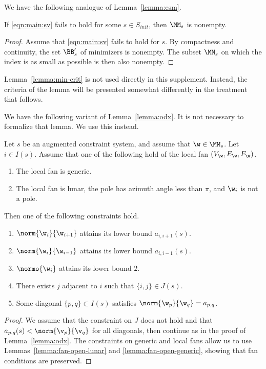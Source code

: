 We have the following analogue of Lemma~\ref{lemma:esm}.

\begin{lemma}\label{lemma:init}
If \eqref{eqn:main:sv} fails to hold for some $s\in S_{init}$, 
then $\MM_s$ is nonempty.
\end{lemma}

\begin{proof}  Assume that \eqref{eqn:main:sv} fails to hold for
$s$.  By compactness and continuity, the set 
$\BB'_s$ of minimizers is nonempty.   
The subset $\MM_s$ on which the index is as small as possible
is then also nonempty.
\end{proof}

Lemma~\ref{lemma:min-crit} is not used directly in this supplement.
Instead, the criteria of the lemma will be presented somewhat differently
in the treatment that follows.

We have the following variant of Lemma~\ref{lemma:odx}.
It is not necessary to formalize that lemma.  We use this instead.

\begin{lemma} Let $s$ be an augmented constraint system,
and assume that $\w\in \MM_s$.  Let $i\in I(s)$.
Assume  that one of the following hold of the local fan $(V_\w,E_\w,F_\w)$.
\begin{enumerate}
\item The local fan is generic.
\item The local fan is lunar, the pole has azimuth
angle less than $\pi$, and $\w_i$ is not a pole.  
\end{enumerate}
Then one of the following   constraints hold.
\begin{enumerate}
\item $\norm{\w_i}{\w_{i+1}}$ attains its lower bound $a_{i,i+1}(s)$.
\item $\norm{\w_i}{\w_{i-1}}$ attains its lower bound $a_{i,i-1}(s)$.
\item $\normo{\w_i}$ attains its lower bound $2$.
\item There exists $j$ adjacent to $i$ such that $\{i,j\}\in J(s)$.
\item Some diagonal $\{p,q\}\subset I(s)$ satisfies
$\norm{\w_p}{\w_q}=a_{p,q}$.
\end{enumerate}
\end{lemma}

\begin{proof} 
We assume that the constraint on $J$ does not hold and
that $a_{p,q}(s)<\norm{\v_p}{\v_q}$ for all diagonals, then continue as in the proof of
Lemma~\ref{lemma:odx}.  The constraints on generic and local fans
allow us to use Lemmas~\ref{lemma:fan-open-lunar} and
\ref{lemma:fan-open-generic}, showing that fan conditions are preserved.
\end{proof}

